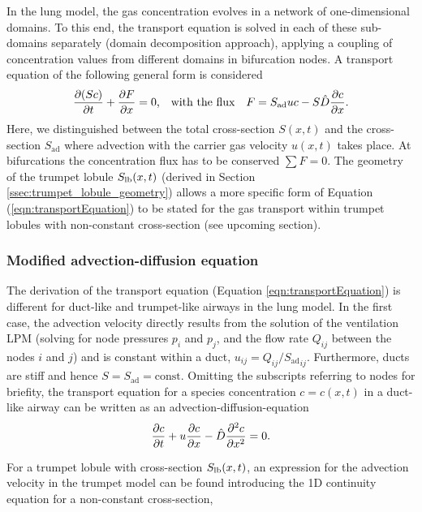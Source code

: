 In the lung model, the gas concentration evolves in a network of one-dimensional domains.
To this end, the transport equation is solved in each of these sub-domains separately (domain decomposition approach), applying a coupling of concentration values from different domains in bifurcation nodes.
A transport equation of the following general form is considered
\begin{equation} \label{eqn:transportEquation}
\frac{\partial (Sc)}{\partial t} + \frac{\partial F}{\partial x} = 0\text{,} \quad\text{with the flux}\quad F = S_\mathrm{ad} u c - S\hat{D}\frac{\partial c}{\partial x} \text{.}
\end{equation}
Here, we distinguished between the total cross-section $S(x,t)$ and the cross-section $S_\mathrm{ad}$ where advection with the carrier gas velocity $u(x,t)$ takes place.
At bifurcations the concentration flux has to be conserved $\sum F = 0$.
The geometry of the trumpet lobule $S_{\mathrm{lb}}(x,t)$ (derived in Section \ref{ssec:trumpet_lobule_geometry}) allows a more specific form of Equation (\ref{eqn:transportEquation}) to be stated for the gas transport within trumpet lobules with non-constant cross-section (see upcoming section).


\subsubsection{Modified advection-diffusion equation} \label{ssec:modified_advection_diffusion_equation}
The derivation of the transport equation (Equation \ref{eqn:transportEquation}) is different for duct-like and trumpet-like airways in the lung model.
In the first case, the advection velocity directly results from the solution of the ventilation LPM (solving for node pressures $p_i$ and $p_j$, and the flow rate $Q_{ij}$ between the nodes $i$ and $j$) and is constant within a duct, $u_{ij} = Q_{ij}/{S_\mathrm{ad}}_{ij}$.
Furthermore, ducts are stiff and hence $S = S_\mathrm{ad} = \text{const}$.
Omitting the subscripts referring to nodes for briefity, the transport equation for a species concentration $c = c(x,t)$ in a duct-like airway can be written as an advection-diffusion-equation
\begin{equation} \label{eqn:advectionDiffusionDuct}
\frac{\partial c}{\partial t} + u\frac{\partial c}{\partial x} - \hat{D}\frac{\partial^2 c}{\partial x^2} = 0 \text{.}
\end{equation}


For a trumpet lobule with cross-section $S_{\mathrm{lb}}(x,t)$, an expression for the advection velocity in the trumpet model can be found introducing the 1D continuity equation for a non-constant cross-section,


